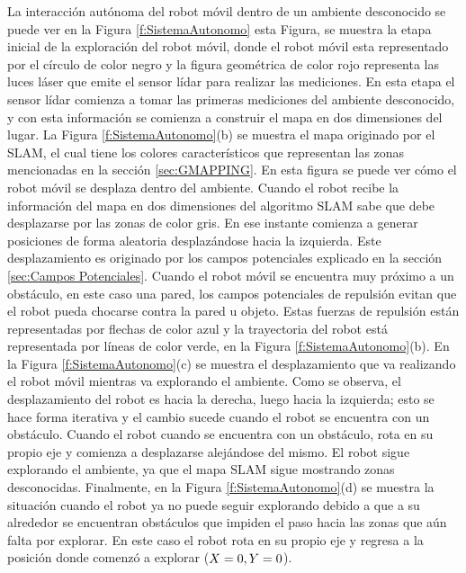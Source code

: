 La interacción autónoma del robot móvil dentro de un ambiente desconocido se puede ver en la 
Figura \ref{f:SistemaAutonomo} esta Figura, se muestra la 
etapa inicial de la exploración del robot móvil, donde el robot móvil esta representado por 
el círculo de color negro y la figura geométrica de color rojo representa las luces láser 
que emite el sensor lídar para realizar las mediciones. En esta etapa el sensor lídar comienza a 
tomar las primeras mediciones del ambiente desconocido, y con esta información se comienza a 
construir el mapa en dos dimensiones del lugar. La Figura \ref{f:SistemaAutonomo}(b) se muestra 
el mapa originado por el SLAM, el cual tiene los colores característicos que representan
las zonas mencionadas en la sección \ref{sec:GMAPPING}. En esta figura se puede ver cómo el robot
móvil se desplaza dentro del ambiente. Cuando el robot recibe la información del mapa en dos 
dimensiones del algoritmo SLAM sabe que debe desplazarse por las zonas de color gris. En ese 
instante comienza a generar posiciones de forma aleatoria desplazándose hacia la izquierda. Este 
desplazamiento es originado por los campos potenciales explicado en la sección 
\ref{sec:Campos Potenciales}. Cuando el robot móvil se encuentra muy próximo a un obstáculo, en 
este caso una pared, los campos potenciales de repulsión evitan que el robot pueda chocarse contra
la pared u objeto. Estas fuerzas de repulsión están representadas por flechas de color azul y la 
trayectoria del robot está representada por líneas de color verde, en la Figura 
\ref{f:SistemaAutonomo}(b). En la Figura \ref{f:SistemaAutonomo}(c) se muestra el desplazamiento 
que va realizando el robot móvil mientras va explorando el ambiente. Como se observa, el 
desplazamiento del robot es hacia la derecha, luego hacia la izquierda; esto se hace forma iterativa
y el cambio sucede cuando el robot se encuentra con un obstáculo. Cuando el robot cuando se encuentra 
con un obstáculo, rota en su propio eje y comienza a desplazarse alejándose del mismo. El robot 
sigue explorando el ambiente, ya que el mapa SLAM sigue mostrando zonas desconocidas. Finalmente, 
en la Figura \ref{f:SistemaAutonomo}(d) se muestra la situación cuando el robot ya no puede seguir 
explorando debido a que a su alrededor se encuentran obstáculos que impiden el paso hacia las zonas
que aún falta por explorar. En este caso el robot rota en su propio eje y regresa a la posición 
donde comenzó a explorar ($\mathnormal X=0,\mathnormal Y=0$).

